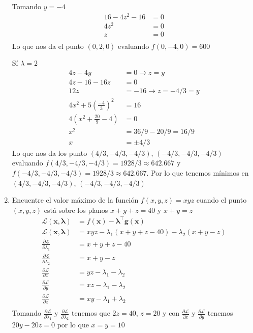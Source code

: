 \documentclass{article}
\begin{document}
\begin{multicols}{2}
\begin{enumerate}
  Tomando $y = -4$
  \begin{align*}
  16 - 4z^2 - 16 &= 0\\
  4z^2 &= 0\\
  z &= 0\\
  \end{align*}
  Lo que nos da el punto $(0, 2, 0)$ evaluando $f(0, -4, 0) = 600$

  Sí $\lambda = 2$
  \begin{align*}
  4z - 4y &= 0 \rightarrow z = y\\
  4z - 16 - 16z &= 0\\
  12z &= -16 \rightarrow z = -4/3 = y\\
  4x^2 + 5(\frac{-4}{3})^2  &= 16\\
  4(x^2 + \frac{20}{9} - 4) &= 0\\
  x^2 &= 36/9 - 20/9 = 16/9\\
  x &= \pm 4/3
  \end{align*}
  Lo que nos da los punto $(4/3, -4/3, -4/3)$, $(-4/3, -4/3, -4/3)$ evaluando $f(4/3, -4/3, -4/3) = 1928/3 \approx 642.667$ y $f(-4/3, -4/3, -4/3) = 1928/3 \approx 642.667$. Por lo que tenemos mínimos en $(4/3, -4/3, -4/3)$, $(-4/3, -4/3, -4/3)$


\item Encuentre el valor máximo de la función $f(x, y, z) = xyz$ cuando el punto $(x, y, z)$ está sobre los planos $x + y + z = 40$ y $x + y = z$
\begin{align*}
\mathcal{L}(\boldsymbol{x}, \boldsymbol{\lambda}) &= f(\boldsymbol{x}) - \boldsymbol{\lambda}^\intercal \boldsymbol{g}(\boldsymbol{x})\\
\mathcal{L}(\boldsymbol{x}, \boldsymbol{\lambda}) &= xyz -\lambda_1(x + y + z - 40) - \lambda_2(x + y - z)\\
\frac{\partial\mathcal{L}}{\partial \lambda_1} &= x+y+z-40\\
\frac{\partial\mathcal{L}}{\partial \lambda_2} &= x+y-z\\
\frac{\partial\mathcal{L}}{\partial x} &= yz-\lambda_1-\lambda_2\\
\frac{\partial\mathcal{L}}{\partial y} &= xz-\lambda_1-\lambda_2\\
\frac{\partial\mathcal{L}}{\partial z} &= xy-\lambda_1+\lambda_2\\
\end{align*}
Tomando $\frac{\partial\mathcal{L}}{\partial \lambda_1}$ y $\frac{\partial\mathcal{L}}{\partial \lambda_2}$ tenemos que $2z = 40$, $z = 20$ y con $\frac{\partial\mathcal{L}}{\partial x}$ y $\frac{\partial\mathcal{L}}{\partial y}$ tenemos $20y -20z = 0$ por lo que $x=y=10$


\end{enumerate}
\end{multicols}
\end{document}
